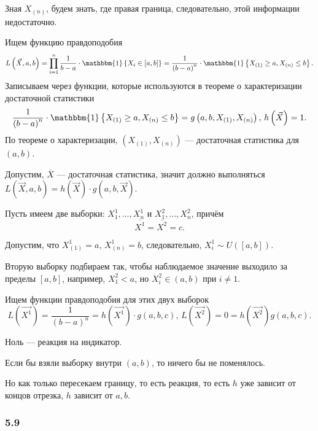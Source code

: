 Зная $X_{ \left( n \right) }$, будем знать, где правая граница, следовательно,
этой информации недостаточно.

Ищем функцию правдоподобия
$$L \left( \vec{X}, a, b \right) =
  \prod \limits_{i = 1}^n
    \frac{1}{b - a} \cdot \mathbbm{1} \left\{ X_i \in \left[ a, b \right] \right\} =
  \frac{1}{ \left( b - a \right)^n} \cdot
  \mathbbm{1} \left\{ X_{ \left( 1 \right) } \geq a, X_{ \left( n \right) } \leq b \right\}.$$
Записываем через функции, которые используются в теореме о характеризации достаточной статистики
$$ \frac{1}{ \left( b - a \right)^n} \cdot
  \mathbbm{1} \left\{ X_{ \left( 1 \right) } \geq a, X_{ \left( n \right) } \leq b \right\} =
  g \left( a, b, X_{ \left( 1 \right) }, X_{ \left( n \right) } \right), \,
  h \left( \vec{X} \right) = 1.$$
По теореме о характеризации, $ \left( X_{ \left( 1 \right) }, X_{ \left( n \right) } \right) $ ---
достаточная статистика для $ \left( a, b \right) $.

Допустим, $ \overline{X}$ --- достаточная статистика,
значит должно выполняться
$L \left( \vec{X}, a, b \right) =
  h \left( \vec{X} \right) \cdot g \left( a, b, \vec{X} \right) $.

Пусть имеем две выборки: $X_1^1, \dotsc, X_n^1$ и $X_1^2, \dotsc, X_n^2$,
причём
$$ \overline{X^1} =
  \overline{X^2} =
  c.$$

Допустим, что $X_{ \left( 1 \right) }^1 = a, \, X_{ \left( n \right) }^1 = b$, следовательно,
$X_i^1 \sim U \left( \left[ a, b \right] \right) $.

Вторую выборку подбираем так,
чтобы наблюдаемое значение выходило за пределы $ \left[ a, b \right] $, например, $X_1^2 < a$,
но $X_i^2 \in \left( a, b \right) $ при $i \neq 1$.

Ищем функции правдоподобия для этих двух выборок
$$L \left( \vec{X^1} \right) =
  \frac{1}{ \left( b - a \right)^n} =
  h \left( \vec{X^1} \right) \cdot g \left( a, b, c \right), \,
  L \left( \vec{X^2} \right) =
  0 =
  h \left( \vec{X^2} \right) g \left( a, b, c \right).$$

Ноль --- реакция на индикатор.

Если бы взяли выборку внутри $ \left( a, b \right) $, то ничего бы не поменялось.

Но как только пересекаем границу, то есть реакция, то есть $h$ уже зависит от концов отрезка,
$h$ зависит от $a, b$.

\subsubsection{5.9}

